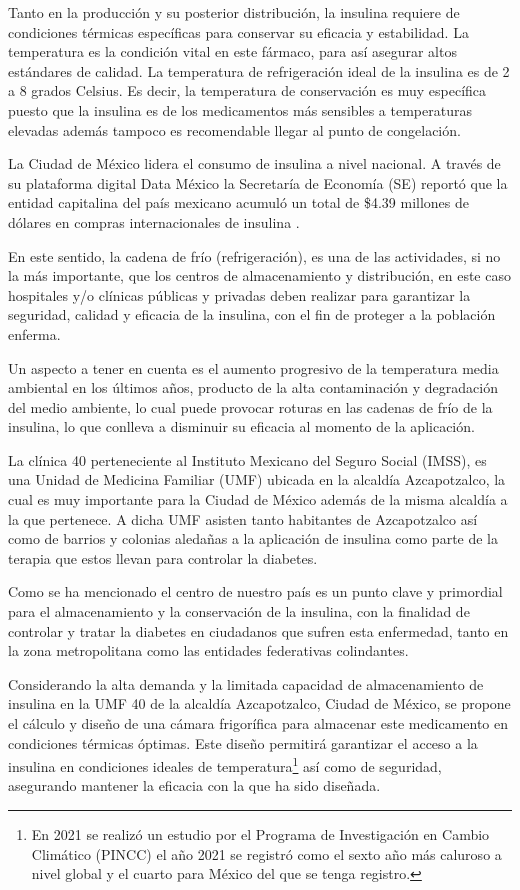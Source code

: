 Tanto en la producción y su posterior distribución, la insulina requiere de condiciones térmicas específicas para conservar su eficacia y estabilidad. La temperatura es la condición vital en este fármaco, para así asegurar altos estándares de calidad. La temperatura de refrigeración ideal de la insulina es de 2 a 8 grados Celsius. Es decir, la temperatura de conservación es muy específica puesto que la insulina es de los medicamentos más sensibles a temperaturas elevadas además tampoco es recomendable llegar al punto de congelación.

La Ciudad de México lidera el consumo de insulina a nivel nacional. A través de su plataforma digital Data México la Secretaría de Economía (SE) reportó que la entidad capitalina del país mexicano acumuló un total de \$4.39 millones de dólares en compras internacionales de insulina \cite{datamex}.

En este sentido, la cadena de frío (refrigeración), es una de las actividades, si no la más importante, que los centros de almacenamiento y distribución, en este caso hospitales y/o clínicas públicas y privadas  deben realizar para garantizar la seguridad, calidad y eficacia de la insulina, con el fin de proteger a la población enferma.

Un aspecto a tener en cuenta es el aumento progresivo de la temperatura media ambiental en los últimos años,  producto de la alta contaminación y degradación del  medio ambiente, lo cual puede provocar roturas en las cadenas de frío de la insulina, lo que conlleva a disminuir su eficacia al momento de la aplicación. 

La clínica 40 perteneciente al Instituto Mexicano del Seguro Social (IMSS), es una Unidad de Medicina Familiar (UMF) ubicada en la alcaldía Azcapotzalco, la cual es muy importante para la Ciudad de México además de la misma alcaldía a la que pertenece. A dicha UMF asisten tanto habitantes de Azcapotzalco así como de barrios y colonias aledañas a la aplicación de insulina como parte de la terapia que estos llevan para controlar la diabetes.

Como se ha mencionado el centro de nuestro país es un punto clave y primordial para el almacenamiento y la conservación de la insulina, con la finalidad de controlar y tratar la diabetes en ciudadanos que sufren esta enfermedad, tanto en la zona metropolitana como las entidades federativas colindantes.

Considerando la alta demanda y la limitada capacidad de almacenamiento de insulina en la UMF 40 de la alcaldía Azcapotzalco, Ciudad de México, se propone el cálculo y diseño de una cámara frigorífica para almacenar este medicamento en condiciones térmicas óptimas. Este diseño permitirá garantizar el acceso a la insulina en condiciones ideales de temperatura\footnote{En 2021 se realizó un estudio por el Programa de Investigación en Cambio Climático (PINCC) el año 2021 se registró como el sexto año más caluroso a nivel global y el cuarto para México del que se tenga registro.} así como de seguridad, asegurando mantener la eficacia con la que ha sido diseñada. 



